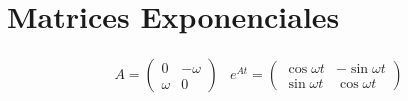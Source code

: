 \section{Matrices Exponenciales}

\begin{equation}
\begin{split}
    A = \begin{pmatrix} 0 & -\omega\\ \omega & 0
    \end{pmatrix} & e^{At} = \begin{pmatrix}
    \cos{\omega t}&-\sin{\omega t}\\
    \sin{\omega t}&\cos{\omega t}\end{pmatrix}
\end{split}
\nonumber
\end{equation}

\newpage
